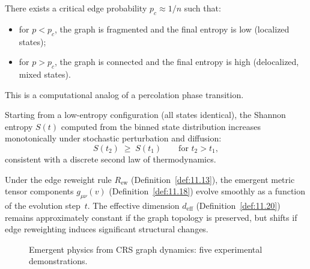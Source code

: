 \begin{proposition}
\label{prop:11.3}
There exists a critical edge probability $p_c \approx 1/n$ such
that:
\begin{itemize}
  \item for $p < p_c$, the graph is fragmented and the final entropy
    is low (localized states);
  \item for $p > p_c$, the graph is connected and the final entropy
    is high (delocalized, mixed states).
\end{itemize}
This is a computational analog of a percolation phase transition.
\end{proposition}

\begin{proposition}
\label{prop:11.4}
Starting from a low-entropy configuration (all states identical), the
Shannon entropy $S(t)$ computed from the binned state distribution
increases monotonically under stochastic perturbation and diffusion:
\begin{equation}
\label{eq:11.entropy_growth}
  S(t_2) \;\geq\; S(t_1)
  \qquad \text{for } t_2 > t_1,
\end{equation}
consistent with a discrete second law of thermodynamics.
\end{proposition}

\begin{proposition}
\label{prop:11.5}
Under the edge reweight rule $R_{\mathrm{ew}}$
(Definition~\ref{def:11.13}), the emergent metric tensor components
$g_{\mu\nu}(v)$ (Definition~\ref{def:11.18}) evolve smoothly as a
function of the evolution step~$t$.  The effective dimension
$d_{\mathrm{eff}}$ (Definition~\ref{def:11.20}) remains approximately
constant if the graph topology is preserved, but shifts if edge
reweighting induces significant structural changes.
\end{proposition}

\begin{figure}[t]
\centering
{}
\caption{Emergent physics from CRS graph dynamics: five experimental
  demonstrations.}
\label{fig:c11:experiments}
\end{figure}

